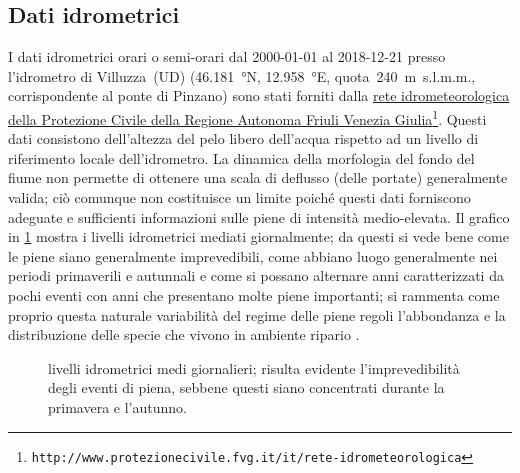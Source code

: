 \subsection{Dati idrometrici}
I dati idrometrici orari o semi-orari dal 2000-01-01 al 2018-12-21 presso l'idrometro di Villuzza~(UD) (\SI{46.181}{\degree}N, \SI{12.958}{\degree}E, quota~\SI{240}{\m}~s.l.m.m., corrispondente al ponte di Pinzano) sono stati forniti dalla \href{http://www.protezionecivile.fvg.it/it/rete-idrometeorologica}{rete idrometeorologica della Protezione Civile della Regione Autonoma Friuli Venezia Giulia}\footnote{\texttt{http://www.protezionecivile.fvg.it/it/rete-idrometeorologica}}.
Questi dati consistono dell'altezza del pelo libero dell'acqua rispetto ad un livello di riferimento locale dell'idrometro.
La dinamica della morfologia del fondo del fiume non permette di ottenere una scala di deflusso (delle portate) generalmente valida; ciò comunque non costituisce un limite poiché questi dati forniscono adeguate e sufficienti informazioni sulle piene di intensità medio-elevata.
Il grafico in \cref{graph:livelli-matrix} mostra i livelli idrometrici mediati giornalmente; da questi si vede bene come le piene siano generalmente imprevedibili, come abbiano luogo generalmente nei periodi primaverili e autunnali e come si possano alternare anni caratterizzati da pochi eventi con anni che presentano molte piene importanti; si rammenta come proprio questa naturale variabilità del regime delle piene regoli l'abbondanza e la distribuzione delle specie che vivono in ambiente ripario .
%
\begin{figure}
	\centering
	
	\caption[livelli idrometrici medi giornalieri]{livelli idrometrici medi giornalieri; risulta evidente l'imprevedibilità degli eventi di piena, sebbene questi siano concentrati durante la primavera e l'autunno.}
	\label{graph:livelli-matrix}
\end{figure}

